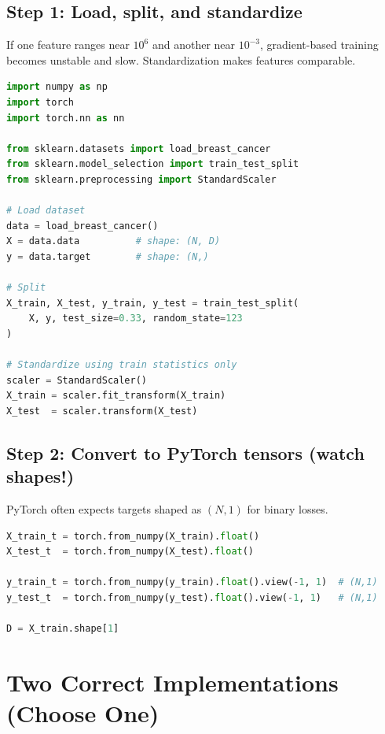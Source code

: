 \subsection{Step 1: Load, split, and standardize}
\begin{tcolorbox}[colframe=black!40,colback=black!2,title=\textbf{Why standardization matters}]
If one feature ranges near $10^6$ and another near $10^{-3}$, gradient-based training becomes unstable and slow.
Standardization makes features comparable.
\end{tcolorbox}

\begin{lstlisting}[language=Python,caption={Load data, train/test split, and standardize (scikit-learn)}]
import numpy as np
import torch
import torch.nn as nn

from sklearn.datasets import load_breast_cancer
from sklearn.model_selection import train_test_split
from sklearn.preprocessing import StandardScaler

# Load dataset
data = load_breast_cancer()
X = data.data          # shape: (N, D)
y = data.target        # shape: (N,)

# Split
X_train, X_test, y_train, y_test = train_test_split(
    X, y, test_size=0.33, random_state=123
)

# Standardize using train statistics only
scaler = StandardScaler()
X_train = scaler.fit_transform(X_train)
X_test  = scaler.transform(X_test)
\end{lstlisting}

\subsection{Step 2: Convert to PyTorch tensors (watch shapes!)}
PyTorch often expects targets shaped as $(N,1)$ for binary losses.

\begin{lstlisting}[language=Python,caption={Convert numpy arrays to torch tensors (float32) and reshape targets}]
X_train_t = torch.from_numpy(X_train).float()
X_test_t  = torch.from_numpy(X_test).float()

y_train_t = torch.from_numpy(y_train).float().view(-1, 1)  # (N,1)
y_test_t  = torch.from_numpy(y_test).float().view(-1, 1)   # (N,1)

D = X_train.shape[1]
\end{lstlisting}

\section{Two Correct Implementations (Choose One)}

